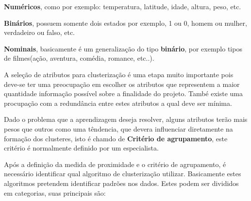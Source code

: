 \begin{alineas}
	\item \textbf{Numéricos}, como por exemplo: temperatura, latitude, idade, altura, peso, etc. 
	\item \textbf{Binários}, possuem somente dois estados por exemplo, 1 ou 0, homem ou mulher, verdadeiro ou falso, etc.
	\item \textbf{Nominais}, basicamente é um generalização do tipo \textbf{binário}, por exemplo tipos de filmes(ação, aventura, comédia, romance, etc..).  
\end{alineas}

A seleção de atributos para clusterização é uma etapa muito importante pois deve-se ter uma preocupação em escolher os atributos
que representem a maior quantidade informação possível sobre a finalidade do projeto. També existe uma procupação com a redundância
entre estes atributos a qual deve ser mínima.

Dado o problema que a aprendizagem deseja resolver, alguns atributos terão mais pesos que outros como uma têndencia, que devera influenciar
diretamente na formação dos clusteres, isto é chamdo de \textbf{Critério de agrupamento}, este critério é normalmente definido por um especialista.

Após a definição da medida de proximidade e o critério de agrupamento, é necessário identificar qual algoritmo de clusterização utilizar.
Basicamente estes algoritmos pretendem identificar padrões nos dados. Estes podem ser divididos em categorias, suas principais são:

